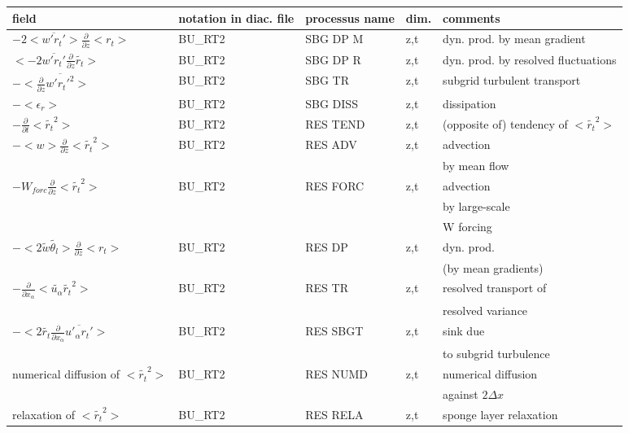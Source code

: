 \begin{center}
\begin{tabular}{||p{5cm}|>{\centering}p{2cm}|>{\centering}p{2.5cm}|>{\centering}p{0.5cm}|p{5.5cm }||}
\hline
\hline
field & notation in diac. file & processus name& dim.  & comments \\
\hline
\hline
$- 2 <\overline{w'r_t'}>\frac{\partial }{\partial z}<r_t>$ & BU\_RT2 & SBG DP M & z,t & dyn. prod. by mean gradient \\
\hline
$<-2 \overline{w'r_t'}\frac{\partial}{\partial z}\tilde{r_t}>$ & BU\_RT2 & SBG DP R & z,t & dyn. prod. by resolved fluctuations\\
\hline
$-<\frac{\partial}{\partial z}\overline{w'r_t'^2}>$ & BU\_RT2 & SBG TR   & z,t & subgrid turbulent transport\\
\hline
$-<\epsilon_r>$ & BU\_RT2 & SBG DISS & z,t & dissipation \\
\hline
$-\frac{\partial }{\partial t}<\tilde{r_t}^2>$ & BU\_RT2 & RES TEND & z,t & (opposite of) tendency of $<\tilde{r_t}^2>$\\
\hline
$-<w>\frac{\partial}{\partial z}<\tilde{r_t}^2>$ & BU\_RT2 & RES ADV  & z,t & advection \\
 & & & & by mean flow\\
\hline
$-W_{forc}\frac{\partial}{\partial z}<\tilde{r_t}^2>$ & BU\_RT2 & RES FORC & z,t & advection \\
 & & & & by large-scale\\
 & & & & W forcing\\
\hline
$-< 2 \tilde{w}\tilde{\theta_l}>\frac{\partial }{\partial z}<r_t>$ & BU\_RT2 & RES DP   & z,t & dyn. prod.\\
 & & & &(by mean gradients) \\
\hline
$-\frac{\partial}{\partial x_\alpha} <\tilde{u_\alpha} \tilde{r_t}^2>$ & BU\_RT2 & RES TR   & z,t & resolved transport of\\
 & & & &resolved variance \\
\hline
$- <2 \tilde{r_t}\frac{\partial}{\partial x_\alpha}\overline{u'_\alpha r_t'}>$
& BU\_RT2 & RES SBGT & z,t & sink due \\
 & & & &to subgrid turbulence \\
\hline
{\rm numerical diffusion of } $<\tilde{r_t}^2>$& BU\_RT2 & RES NUMD & z,t & numerical diffusion\\
 & & & &against $2\Delta x$ \\
\hline
{\rm relaxation of }$<\tilde{r_t}^2>$ & BU\_RT2 & RES RELA & z,t& sponge layer relaxation \\

\end{tabular}
\end{center}
